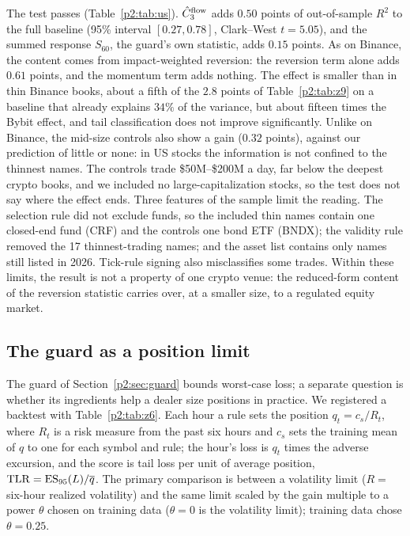The test passes (Table~\ref{p2:tab:us}). $\hat C_3^{\rm flow}$ adds $0.50$ points of out-of-sample $R^2$ to the full baseline (95\% interval $[0.27,0.78]$, Clark--West $t=5.05$), and the summed response $S_{60}$, the guard's own statistic, adds $0.15$ points. As on Binance, the content comes from impact-weighted reversion: the reversion term alone adds $0.61$ points, and the momentum term adds nothing. The effect is smaller than in thin Binance books, about a fifth of the $2.8$ points of Table~\ref{p2:tab:z9} on a baseline that already explains $34\%$ of the variance, but about fifteen times the Bybit effect, and tail classification does not improve significantly. Unlike on Binance, the mid-size controls also show a gain ($0.32$ points), against our prediction of little or none: in US stocks the information is not confined to the thinnest names. The controls trade \$50M--\$200M a day, far below the deepest crypto books, and we included no large-capitalization stocks, so the test does not say where the effect ends. Three features of the sample limit the reading. The selection rule did not exclude funds, so the included thin names contain one closed-end fund (CRF) and the controls one bond ETF (BNDX); the validity rule removed the 17 thinnest-trading names; and the asset list contains only names still listed in 2026. Tick-rule signing also misclassifies some trades. Within these limits, the result is not a property of one crypto venue: the reduced-form content of the reversion statistic carries over, at a smaller size, to a regulated equity market.

\subsection{The guard as a position limit}\label{p2:sec:backtest}
The guard of Section~\ref{p2:sec:guard} bounds worst-case loss; a separate question is whether its ingredients help a dealer size positions in practice. We registered a backtest with Table~\ref{p2:tab:z6}. Each hour a rule sets the position $q_t=c_s/R_t$, where $R_t$ is a risk measure from the past six hours and $c_s$ sets the training mean of $q$ to one for each symbol and rule; the hour's loss is $q_t$ times the adverse excursion, and the score is tail loss per unit of average position, ${\rm TLR}={\rm ES}_{95}(L)/\overline q$. The primary comparison is between a volatility limit ($R=$ six-hour realized volatility) and the same limit scaled by the gain multiple to a power $\theta$ chosen on training data ($\theta=0$ is the volatility limit); training data chose $\theta=0.25$.

